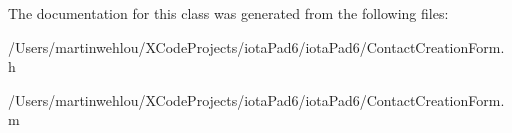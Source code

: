 The documentation for this class was generated from the following files:\begin{DoxyCompactItemize}
\item 
/Users/martinwehlou/XCodeProjects/iotaPad6/iotaPad6/ContactCreationForm.h\item 
/Users/martinwehlou/XCodeProjects/iotaPad6/iotaPad6/ContactCreationForm.m\end{DoxyCompactItemize}
